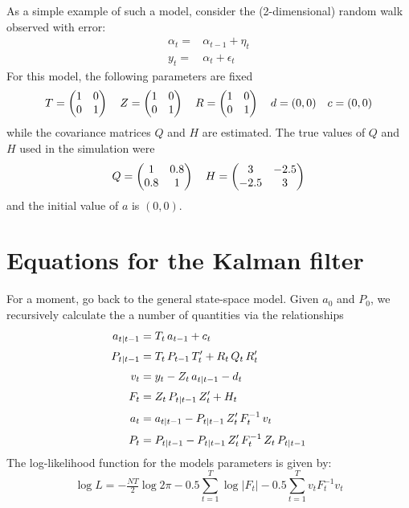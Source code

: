 As a simple example of such a model, consider the (2-dimensional) random walk observed with error: %
 \begin{align}
  \nonumber \alpha_t =&\alpha_{t-1}+\eta_t\\
   y_t =&\alpha_t+\epsilon_t
 \end{align}
For this model, the following parameters are fixed
$$ T=\begin{pmatrix}1 & 0\\
                    0 & 1 \end{pmatrix}
  \quad
   Z=\begin{pmatrix}1 & 0\cr
                    0 & 1 \end{pmatrix}
  \quad
   R=\begin{pmatrix}1 & 0\cr
                    0 & 1\end{pmatrix}
  \quad
  d=(0,0)
  \quad
  c=(0,0)
$$
while the covariance matrices $Q$ and $H$ are estimated. The true values of $Q$ and $H$ used in the simulation were %
$$
   Q=\begin{pmatrix}1 & 0.8\cr
                   0.8 & 1 \end{pmatrix}
  \quad
   H=\begin{pmatrix}3 & -2.5\cr
                   -2.5 & 3 \end{pmatrix}
$$
and the initial value of $a$ is $(0,0)$.%
 
\section{Equations for the Kalman filter}

For a moment, go back to the general state-space model.
Given $a_0$ and $P_0$, we recursively calculate the a number of quantities
via the relationships
 \begin{align}
   \nonumber  a_{t|t-1} &= T_t\, a_{t-1}+c_t\\[3pt]
    \nonumber   P_{t|t-1} &=T_t\, P_{t-1}\, T^\prime_t +R_t\, Q_t\, R^\prime_t\\[3pt]
   \nonumber    v_t &=y_t-Z_t\, a_{t|t-1}-d_t\\[3pt]
    \nonumber   F_t &=Z_t\, P_{t|t-1}\, Z_t^\prime+H_t\\[3pt]
    \nonumber   a_t &=a_{t|t-1}-P_{t|t-1}\, Z_t^\prime\, F_t^{-1}\, v_t\\[3pt]
      P_t &= P_{t|t-1}-P_{t|t-1}\, Z_t^\prime\, F_t^{-1}\, Z_t\, P_{t|t-1}
 \end{align}
The log-likelihood function for the models parameters is
given by:
$$\log L = -\tfrac{NT}{ 2}\log 2\pi -0.5 \sum_{t=1}^T \log|F_t|
        -0.5 \sum_{t=1}^T v_t F_t^{-1} v_t
$$

